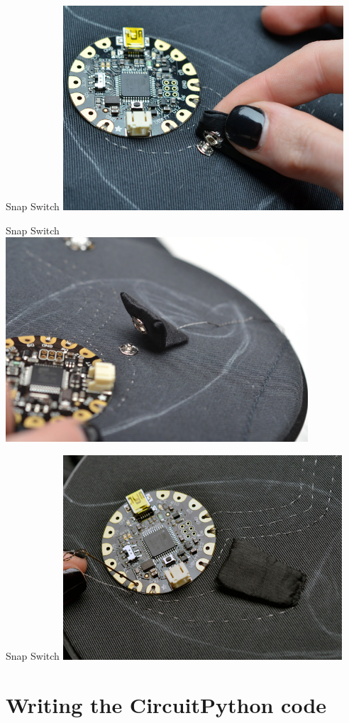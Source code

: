 \documentclass{beamer}
\begin{document}
\begin{frame}[fragile]{Snap Switch}
\includegraphics[height=3in]{flora-angler-embroidery-22.jpg}
\end{frame}
\begin{frame}[fragile]{Snap Switch}
\includegraphics[height=3in]{flora-angler-embroidery-23.jpg}
\end{frame}
\begin{frame}[fragile]{Snap Switch}
\includegraphics[height=3in]{flora-angler-embroidery-24.jpg}
\end{frame}
\part{Writing the CircuitPython code}
\end{document}
